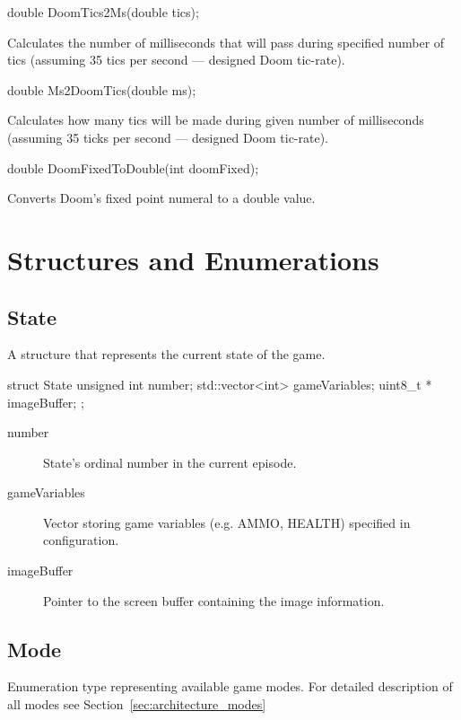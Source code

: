 \vspace{20pt}
\begin{clinee}
	double DoomTics2Ms(double tics);
\end{clinee}

	Calculates the number of milliseconds that will pass during specified number of tics (assuming 35 tics per second --- designed Doom tic-rate).


\vspace{20pt}
\begin{clinee}
	double Ms2DoomTics(double ms);
\end{clinee}

	Calculates how many tics will be made during given number of milliseconds (assuming 35 ticks per second --- designed Doom tic-rate).


\vspace{20pt}
\begin{clinee}
	double DoomFixedToDouble(int doomFixed);
\end{clinee}

	Converts Doom's fixed point numeral to a double value.


\vspace{20pt}
\section{Structures and Enumerations} \label{sec:structs}
\subsection{State}

	A structure that represents the current state of the game.

\vspace{20pt}	
\begin{clinee}
	struct State {
	    unsigned int number; 
	    std::vector<int> gameVariables;
	    uint8_t * imageBuffer;
	};
\end{clinee}
\begin{description}
	\item[number] State's ordinal number in the current episode.
	\item[gameVariables] Vector storing game variables (e.g. AMMO, HEALTH) specified in configuration. 
	\item[imageBuffer] Pointer to the screen buffer containing the image information.
\end{description}
\subsection{Mode}\label{subsec:mode}
	Enumeration type representing available game modes. For detailed description of all modes see Section~\ref{sec:architecture_modes}

